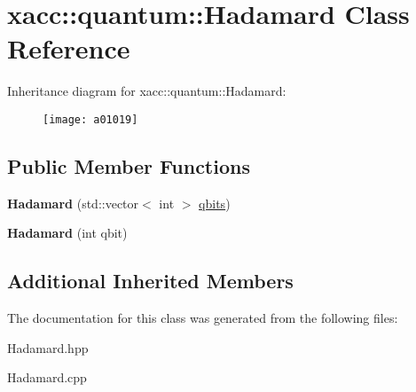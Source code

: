 \hypertarget{a01019}{}\section{xacc\+:\+:quantum\+:\+:Hadamard Class Reference}
\label{a01019}
Inheritance diagram for xacc\+:\+:quantum\+:\+:Hadamard\+:\begin{figure}[H]
\begin{center}
\leavevmode
\texttt{[image: a01019]}
\end{center}
\end{figure}
\subsection*{Public Member Functions}
\begin{DoxyCompactItemize}
\item 
\mbox{\label{a01019_a1f26925eeb4a52ca7e52dd9158fe7005}} 
{\bfseries Hadamard} (std\+::vector$<$ int $>$ \hyperlink{a00991_a2a56be6c2519ea65df4d06f4abae1393}{qbits})
\item 
\mbox{\label{a01019_aac4e06aae35583bcce39b6b178948364}} 
{\bfseries Hadamard} (int qbit)
\end{DoxyCompactItemize}
\subsection*{Additional Inherited Members}


The documentation for this class was generated from the following files\+:\begin{DoxyCompactItemize}
\item 
Hadamard.\+hpp\item 
Hadamard.\+cpp\end{DoxyCompactItemize}
